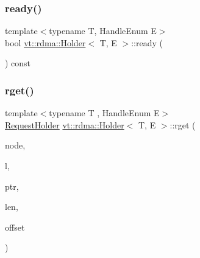 \subsubsection{\texorpdfstring{ready()}{ready()}}
{\footnotesize\ttfamily template$<$typename T, Handle\+Enum E$>$ \\
bool \hyperlink{structvt_1_1rdma_1_1_holder}{vt\+::rdma\+::\+Holder}$<$ T, E $>$\+::ready (\begin{DoxyParamCaption}{ }\end{DoxyParamCaption}) const\hspace{0.3cm}{\ttfamily [inline]}}

\mbox{\label{structvt_1_1rdma_1_1_holder_abca462aa3e98d1c0fb4852743eaed04a}} 
\subsubsection{\texorpdfstring{rget()}{rget()}}
{\footnotesize\ttfamily template$<$typename T , Handle\+Enum E$>$ \\
\hyperlink{structvt_1_1rdma_1_1_request_holder}{Request\+Holder} \hyperlink{structvt_1_1rdma_1_1_holder}{vt\+::rdma\+::\+Holder}$<$ T, E $>$\+::rget (\begin{DoxyParamCaption}\item[{\hyperlink{namespacevt_a866da9d0efc19c0a1ce79e9e492f47e2}{vt\+::\+Node\+Type}}]{node,  }\item[{\hyperlink{namespacevt_1_1rdma_ac5c20b41a653e520b6305d4d454ecb70}{Lock}}]{l,  }\item[{T $\ast$}]{ptr,  }\item[{std\+::size\+\_\+t}]{len,  }\item[{int}]{offset }\end{DoxyParamCaption})}

\mbox{\label{structvt_1_1rdma_1_1_holder_ae3f9105ec3abe794bd39f24ef55f1c29}} 
